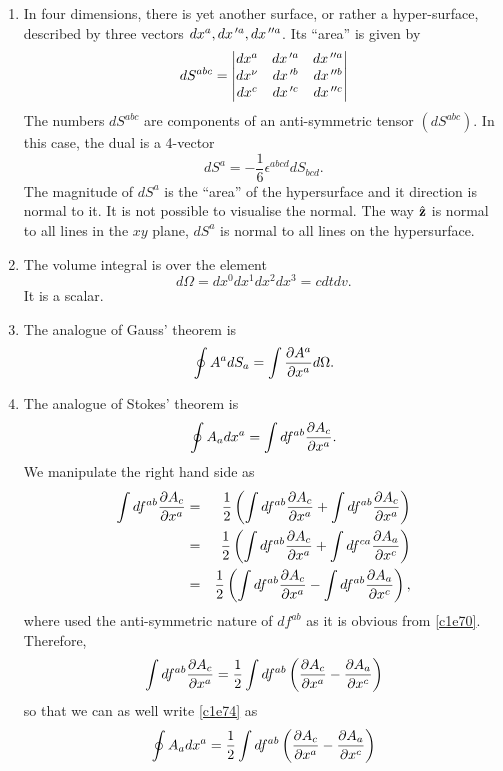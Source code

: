 \begin{enumerate}
\begin{enumerate}
\item In four dimensions, there is yet another surface, or rather a 
hyper-surface, described by three vectors $dx^a, dx^{{\,\prime} a}, dx^{{\,\prime\prime} a}$. Its 
``area'' is given by
\begin{equation}\label{c1e71}
dS^{abc} = \begin{vmatrix}
dx^a & dx^{{\,\prime} a} & dx^{{\,\prime\prime} a} \\
dx^\nu & dx^{{\,\prime} b} & dx^{{\,\prime\prime} b} \\
dx^c & dx^{{\,\prime} c} & dx^{{\,\prime\prime} c}
\end{vmatrix}
\end{equation}
The numbers $dS^{abc}$ are components of an anti-symmetric tensor 
$(dS^{abc})$. In this case, the dual is a 4-vector
\begin{equation}\label{c1e72}
dS^a = -\frac{1}{6}\epsilon^{abcd}dS_{bcd}.
\end{equation}
The magnitude of $dS^a$ is the ``area'' of the hypersurface and it direction
is normal to it. It is not possible to visualise the normal. The way $\hat{\mathbf{z}}$ is
normal to all lines in the $xy$ plane, $dS^a$ is normal to all lines on the
hypersurface.

\item The volume integral is over the element
\begin{equation}\label{c1e73}
d\Omega = dx^0 dx^1 dx^2 dx^3 = cdtdv.
\end{equation}
It is a scalar.

\item The analogue of Gauss' theorem is
\begin{equation}\label{c1e74}
\oint A^a dS_a = \int \frac{\partial{A^a}}{\partial{x^a}}d\Omega.
\end{equation}

\item The analogue of Stokes' theorem is
\begin{equation}\label{c1e75}
\oint A_a dx^a = \int df^{ab}\frac{\partial{A_{c}}}{\partial{x^a}}.
\end{equation}
We manipulate the right hand side as
\begin{eqnarray*}
\int df^{ab}\frac{\partial{A_{c}}}{\partial{x^a}} &=& \frac{1}{2}\left(\int df^{ab}\frac{\partial{A_{c}}}{\partial{x^a}} +
\int df^{ab}\frac{\partial{A_{c}}}{\partial{x^a}}\right) \\
&=& \frac{1}{2}\left(\int df^{ab}\frac{\partial{A_{c}}}{\partial{x^a}} + 
    \int df^{c a}\frac{\partial{A_{a}}}{\partial{x^c}}\right) \\
&=& \frac{1}{2}\left(\int df^{ab}\frac{\partial{A_{c}}}{\partial{x^a}} - 
    \int df^{ab}\frac{\partial{A_{a}}}{\partial{x^c}}\right),
\end{eqnarray*}
where used the anti-symmetric nature of $df^{ab}$ as it is obvious from 
\eqref{c1e70}. Therefore,
\[
\int df^{ab}\frac{\partial{A_{c}}}{\partial{x^a}} = 
\frac{1}{2}\int df^{ab}\left(\frac{\partial{A_{c}}}{\partial{x^a}} - \frac{\partial{A_{a}}}{\partial{x^c}}\right)
\]
so that we can as well write \eqref{c1e74} as
\begin{equation}\label{c1e76}
\oint A_a dx^a = \frac{1}{2}\int df^{ab}
\left(\frac{\partial{A_{c}}}{\partial{x^a}} - \frac{\partial{A_{a}}}{\partial{x^c}}\right)
\end{equation}


\end{enumerate}
\end{enumerate}
